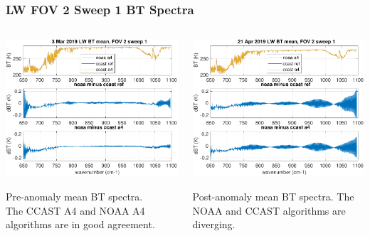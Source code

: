\documentclass[10pt]{beamer}
\begin{document}
\begin{frame}
\frametitle{LW FOV 2 Sweep 1 BT Spectra}
\begin{columns}[t]
\begin{column}{0.5\textwidth}
  \begin{centering}
  \includegraphics[width=\textwidth]{figures/LW_MW_good_BT_fov2_sd1.pdf}
  \end{centering}\vspace{3mm}
  Pre-anomaly mean BT spectra.  \\The CCAST A4 and NOAA A4 algorithms
  are in good agreement.

\end{column}
\begin{column}{0.5\textwidth}  
  \begin{centering}
  \includegraphics[width=\textwidth]{figures/LW_MW_fail_BT_fov2_sd1.pdf}
  \end{centering}\vspace{3mm}
  Post-anomaly mean BT spectra.  The NOAA and CCAST algorithms are
  diverging.

\end{column}
\end{columns}
\end{frame}
\end{document}
